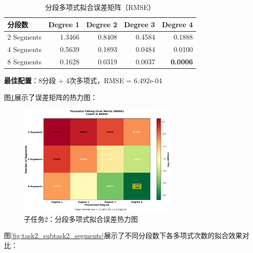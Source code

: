 \documentclass[a4paper,12pt]{article}
\theoremstyle{definition}
\begin{document}
\begin{table}[H]
\centering
\caption{分段多项式拟合误差矩阵（RMSE）}
\begin{tabular}{lrrrr}
\toprule
\textbf{分段数} & \textbf{Degree 1} & \textbf{Degree 2} & \textbf{Degree 3} & \textbf{Degree 4} \\
\midrule
2 Segments & 1.3466 & 0.8408 & 0.4584 & 0.1888 \\
4 Segments & 0.5639 & 0.1893 & 0.0484 & 0.0100 \\
\rowcolor{tablerowcolor}
8 Segments & 0.1628 & 0.0319 & 0.0037 & \textbf{0.0006} \\
\bottomrule
\end{tabular}
\end{table}

\textbf{最佳配置}：8分段 + 4次多项式，RMSE = 6.492e-04

图\ref{fig:task2_subtask2_heatmap}展示了误差矩阵的热力图：

\begin{figure}[H]
\centering
\includegraphics[width=0.7\textwidth]{results/task2/subtask2/error_heatmap.png}
\caption{子任务2：分段多项式拟合误差热力图}
\label{fig:task2_subtask2_heatmap}
\end{figure}

图\ref{fig:task2_subtask2_segments}展示了不同分段数下各多项式次数的拟合效果对比：
\end{document}
